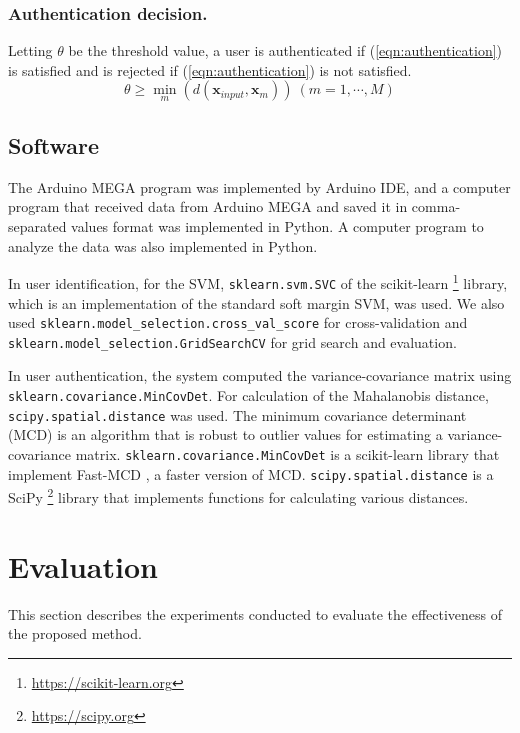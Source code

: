 \documentclass[english,preprint,JIP]{ipsj}
\begin{document}
\subsubsection{Authentication decision.}
\label{sec:authentication_decision}
Letting $\theta$ be the threshold value, a user is authenticated if (\ref{eqn:authentication}) is satisfied and is rejected if (\ref{eqn:authentication}) is not satisfied.
\begin{equation}
\label{eqn:authentication}
  \theta \geq \min_m(d(\bm{x}_{input},\bm{x}_m))~(m=1,\cdots,M)
\end{equation}


\subsection{Software}
The Arduino MEGA program was implemented by Arduino IDE, and a computer program that received data from Arduino MEGA and saved it in comma-separated values format was implemented in Python. A computer program to analyze the data was also implemented in Python.\par

In user identification, for the SVM, \texttt{sklearn.svm.SVC} of the scikit-learn \footnote{\url{https://scikit-learn.org}} library, which is an implementation of the standard soft margin SVM, was used. We also used \texttt{sklearn.model\_selection.cross\_val\_score} for cross-validation and \texttt{sklearn.model\_selection.GridSearchCV} for grid search and evaluation.\par

In user authentication, the system computed the variance-covariance matrix using \texttt{sklearn.covariance.MinCovDet}. For calculation of the Mahalanobis distance, \texttt{scipy.spatial.distance} was used. The minimum covariance determinant (MCD) is an algorithm that is robust to outlier values for estimating a variance-covariance matrix. \texttt{sklearn.covariance.MinCovDet} is a scikit-learn library that implement Fast-MCD \cite{fast_mcd}, a faster version of MCD. \texttt{scipy.spatial.distance} is a SciPy \footnote{\url{https://scipy.org}} library that implements functions for calculating various distances.



\section{Evaluation}
\label{sec:evaluation}
This section describes the experiments conducted to evaluate the effectiveness of the proposed method.
\end{document}

